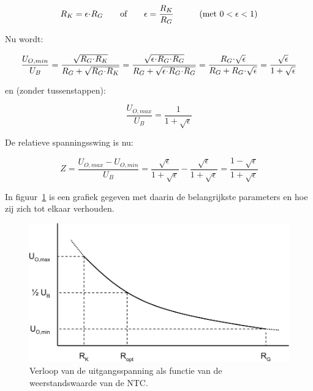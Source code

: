 \documentclass[12pt,a4paper,final,twoside,fleqn]{article}
\let\oldcdot\cdot
\renewcommand{\cdot}{\kern-.10em\oldcdot\kern-.10em}
\begin{document}
\begin{equation}
R_K = \epsilon\cdot R_G \qquad\text{of}\qquad \epsilon=\dfrac{R_K}{R_G}
\qquad\quad\text{(met } 0<\epsilon <1)
\end{equation}

Nu wordt:

\begin{equation}
\label{equ:uominub}
\dfrac{U_{O,min}}{U_B} = \dfrac{\sqrt{R_G\cdot R_K}}{R_G + \sqrt{R_G\cdot R_K}}
                       = \dfrac{\sqrt{\epsilon\cdot R_G\cdot R_G}}{R_G+\sqrt{\epsilon\cdot R_G\cdot R_G}}
                       = \dfrac{R_G\cdot\sqrt{\epsilon}}{R_G+R_G\cdot\sqrt{\epsilon}}
                       = \dfrac{\sqrt{\epsilon}}{1+\sqrt{\epsilon}}
\end{equation}

en (zonder tussenstappen):

\begin{equation}
\dfrac{U_{O,max}}{U_B} = \dfrac{1}{1+\sqrt{\epsilon}}
\end{equation}

De relatieve spanningsswing is nu:

\begin{equation}
\label{equ:resspanswing}
Z =
\dfrac{U_{O,max}-U_{O,min}}{U_B} =
\dfrac{\sqrt{\epsilon}}{1+\sqrt{\epsilon}} - \dfrac{\sqrt{\epsilon}}{1+\sqrt{\epsilon}} =
\dfrac{1 - \sqrt{\epsilon}}{1+\sqrt{\epsilon}}
\end{equation}

In figuur~\ref{fig:ntc_graph1} is een grafiek gegeven met daarin de belangrijkste
parameters en hoe zij zich tot elkaar verhouden.

\begin{figure}[ht!]
\centering
\includegraphics[scale=0.63]{drawings/ntc_graph1}
\caption{Verloop van de uitgangsspanning als functie van de weerstandswaarde van de NTC.}
\label{fig:ntc_graph1}
\end{figure}
\end{document}
